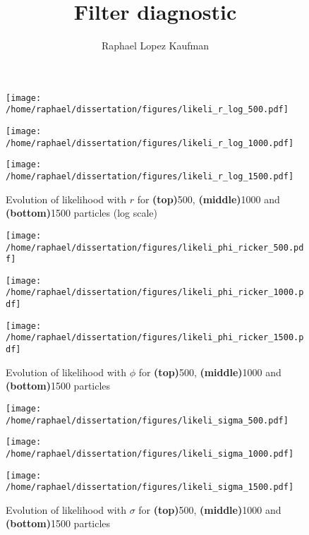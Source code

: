 \documentclass{article}
\title{Filter diagnostic}
\author{Raphael Lopez Kaufman}
\date{}
\begin{document}
	
	\begin{figure}[htb]
		\centering
		\begin{minipage}{0.6\textwidth}
			\centering
			\texttt{[image: /home/raphael/dissertation/figures/likeli\_r\_log\_500.pdf]}
		\end{minipage}
		\begin{minipage}{0.6\textwidth}
			\centering
			\texttt{[image: /home/raphael/dissertation/figures/likeli\_r\_log\_1000.pdf]}
		\end{minipage}
		\begin{minipage}{0.6\textwidth}
			\centering
			\texttt{[image: /home/raphael/dissertation/figures/likeli\_r\_log\_1500.pdf]}
		\end{minipage}
		\caption{Evolution of likelihood with $r$ for \textbf{(top)}500, \textbf{(middle)}1000 and \textbf{(bottom)}1500 particles (log scale)}
		\label{fig:r}
	\end{figure}
	
		\begin{figure}[htb]
			\centering
			\begin{minipage}{0.6\textwidth}
				\centering
				\texttt{[image: /home/raphael/dissertation/figures/likeli\_phi\_ricker\_500.pdf]}
			\end{minipage}
			\begin{minipage}{0.6\textwidth}
				\centering
				\texttt{[image: /home/raphael/dissertation/figures/likeli\_phi\_ricker\_1000.pdf]}
			\end{minipage}
			\begin{minipage}{0.6\textwidth}
				\centering
				\texttt{[image: /home/raphael/dissertation/figures/likeli\_phi\_ricker\_1500.pdf]}
			\end{minipage}
			\caption{Evolution of likelihood with $\phi$ for \textbf{(top)}500, \textbf{(middle)}1000 and \textbf{(bottom)}1500 particles}
			\label{fig:phi}
		\end{figure}

		\begin{figure}[htb]
			\centering
			\begin{minipage}{0.6\textwidth}
				\centering
				\texttt{[image: /home/raphael/dissertation/figures/likeli\_sigma\_500.pdf]}
			\end{minipage}
			\begin{minipage}{0.6\textwidth}
				\centering
				\texttt{[image: /home/raphael/dissertation/figures/likeli\_sigma\_1000.pdf]}
			\end{minipage}
			\begin{minipage}{0.6\textwidth}
				\centering
				\texttt{[image: /home/raphael/dissertation/figures/likeli\_sigma\_1500.pdf]}
			\end{minipage}
			\caption{Evolution of likelihood with $\sigma$ for \textbf{(top)}500, \textbf{(middle)}1000 and \textbf{(bottom)}1500 particles}
			\label{fig:sigma}
		\end{figure}
		
\end{document}
